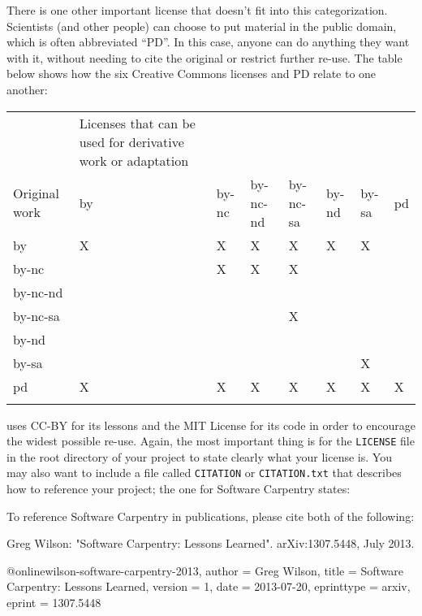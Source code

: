 \documentclass{book}
\begin{document}
There is one other important license that doesn't fit into this
categorization. Scientists (and other people) can choose to put material
in the public domain, which is often abbreviated ``PD''. In this case,
anyone can do anything they want with it, without needing to cite the
original or restrict further re-use. The table below shows how the six
Creative Commons licenses and PD relate to one another:

\begin{tabular}{llllllll}
\hline\noalign{\medskip}
& Licenses that can be used for derivative work or adaptation
\\\noalign{\medskip}
Original work & by & by-nc & by-nc-nd & by-nc-sa & by-nd & by-sa & pd
\\\noalign{\medskip}
by & X & X & X & X & X & X &
\\\noalign{\medskip}
by-nc & & X & X & X & & &
\\\noalign{\medskip}
by-nc-nd & & & & & & &
\\\noalign{\medskip}
by-nc-sa & & & & X & & &
\\\noalign{\medskip}
by-nd & & & & & & &
\\\noalign{\medskip}
by-sa & & & & & & X &
\\\noalign{\medskip}
pd & X & X & X & X & X & X & X
\\\noalign{\medskip}
\hline
\end{tabular}

uses CC-BY for its lessons and the MIT License for its code in order to
encourage the widest possible re-use. Again, the most important thing is
for the \texttt{LICENSE} file in the root directory of your project to
state clearly what your license is. You may also want to include a file
called \texttt{CITATION} or \texttt{CITATION.txt} that describes how to
reference your project; the one for Software Carpentry states:

\begin{VerbFile}
To reference Software Carpentry in publications, please cite both of the following:

Greg Wilson: "Software Carpentry: Lessons Learned". arXiv:1307.5448, July 2013.

@online{wilson-software-carpentry-2013,
  author      = {Greg Wilson},
  title       = {Software Carpentry: Lessons Learned},
  version     = {1},
  date        = {2013-07-20},
  eprinttype  = {arxiv},
  eprint      = {1307.5448}
}
\end{VerbFile}
\end{document}
